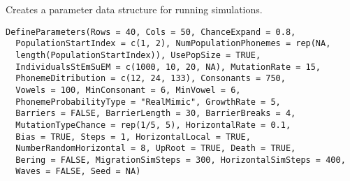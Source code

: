 \documentclass[a4paper]{book}
\begin{document}
%
\begin{Description}\relax
Creates a parameter data structure for running simulations.
\end{Description}
%
\begin{Usage}
\begin{verbatim}
DefineParameters(Rows = 40, Cols = 50, ChanceExpand = 0.8,
  PopulationStartIndex = c(1, 2), NumPopulationPhonemes = rep(NA,
  length(PopulationStartIndex)), UsePopSize = TRUE,
  IndividualsStEmSuEM = c(1000, 10, 20, NA), MutationRate = 15,
  PhonemeDitribution = c(12, 24, 133), Consonants = 750,
  Vowels = 100, MinConsonant = 6, MinVowel = 6,
  PhonemeProbabilityType = "RealMimic", GrowthRate = 5,
  Barriers = FALSE, BarrierLength = 30, BarrierBreaks = 4,
  MutationTypeChance = rep(1/5, 5), HorizontalRate = 0.1,
  Bias = TRUE, Steps = 1, HorizontalLocal = TRUE,
  NumberRandomHorizontal = 8, UpRoot = TRUE, Death = TRUE,
  Bering = FALSE, MigrationSimSteps = 300, HorizontalSimSteps = 400,
  Waves = FALSE, Seed = NA)
\end{verbatim}
\end{Usage}
%
\end{document}

